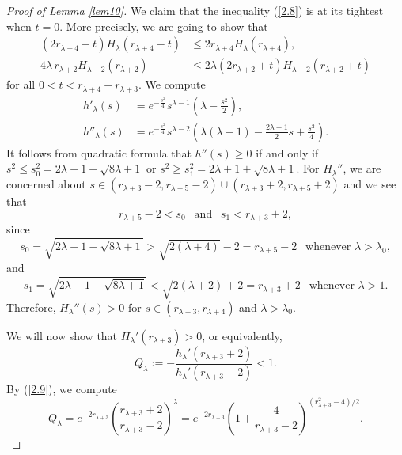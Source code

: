\documentclass{amsart}
\theoremstyle{Corollary}
\numberwithin{equation}{section}
\begin{document}
\begin{proof}[Proof of Lemma \ref{lem10}]
We claim that the inequality (\ref{2.8})
is at its tightest when $t=0$.
More precisely, we are going to show that
\begin{equation}\label{2.10}
\begin{split}
(2r_{\lambda+4}-t)H_\lambda(r_{\lambda+4}-t)&\leq 2r_{\lambda+4}H_\lambda(r_{\lambda+4}),\\
4 \lambda\, r_{\lambda+2}H_{\lambda-2}(r_{\lambda+2})&\leq 2\lambda(2r_{\lambda+2}+t)H_{\lambda-2}(r_{\lambda+2}+t)
\end{split}
\end{equation}
for all $0<t<r_{\lambda+4}-r_{\lambda+3}$.
We compute
\begin{equation}\label{2.9}
\begin{split}
h'_\lambda(s)&=e^{-\frac{s^2}{4}}s^{\lambda-1}\left(\lambda-\frac{s^2}{2}\right),\\
h''_\lambda(s)&=e^{-\frac{s^2}{4}}s^{\lambda-2}\left(\lambda(\lambda-1)-\frac{2\lambda+1}{2}s+\frac{s^2}{4}\right).
\end{split}
\end{equation}
It follows from quadratic formula that
$h''(s)\geq 0$ if and only if
$s^2\leq s_0^2=2\lambda+1-\sqrt{8\lambda+1}$
or $s^2\geq s_1^2=2\lambda+1+\sqrt{8\lambda+1}$.
For $H_\lambda''$, we are concerned about
$s\in (r_{\lambda+3}-2, r_{\lambda+5}-2)\cup(r_{\lambda+3}+2, r_{\lambda+5}+2)$
and we see that
$$r_{\lambda+5}-2<s_0~~\mbox{ and }~~s_1<r_{\lambda+3}+2,$$
since
$$s_0=\sqrt{2\lambda+1-\sqrt{8\lambda+1}}>\sqrt{2(\lambda+4)}-2=r_{\lambda+5}-2~~\mbox{ whenever }\lambda>\lambda_0,$$
and
$$s_1=\sqrt{2\lambda+1+\sqrt{8\lambda+1}}<\sqrt{2(\lambda+2)}+2=r_{\lambda+3}+2~~\mbox{ whenever }\lambda>1.$$
Therefore, $H_\lambda''(s)>0$ for $s\in (r_{\lambda+3},r_{\lambda+4})$ and $\lambda>\lambda_0$.



We will now show that $H_\lambda'(r_{\lambda+3})>0$, or equivalently,
\begin{equation*}
Q_\lambda:=-\frac{h_\lambda'(r_{\lambda+3}+2)}{h_\lambda'(r_{\lambda+3}-2)}<1.
\end{equation*}
By (\ref{2.9}), we compute
\begin{equation}\label{2.11}
Q_\lambda=e^{-2r_{\lambda+3}}\left(\frac{r_{\lambda+3}+2}{r_{\lambda+3}-2}\right)^{\lambda}
=e^{-2r_{\lambda+3}}\left(1+\frac{4}{r_{\lambda+3}-2}\right)^{(r_{\lambda+3}^2-4)/2}.
\end{equation}



\end{proof}
\end{document}
